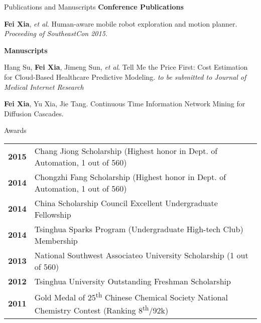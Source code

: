 \documentclass{resume} %
\begin{document}
\begin{rSection}{Publications and Manuscripts}
{\bf Conference Publications}
\begin{enumerate}[label={[}\arabic*{]}]
	\item {\bf Fei Xia}, {\it et al}. Human-aware mobile robot exploration and motion planner. {\it Proceeding of SoutheastCon 2015.}	
\end{enumerate}
{\bf Manuscripts}

\begin{enumerate}[label={[}\arabic*{]}]
	\item Hang Su, {\bf Fei Xia}, Jimeng Sun, {\it et al}. Tell Me the Price First: Cost Estimation for Cloud-Based Healthcare Predictive Modeling. {\it to be submitted to Journal of Medical Internet Research}
	\item {\bf Fei Xia}, Yu Xia, Jie Tang. Continuous Time Information Network Mining for Diffusion Cascades. 	
\end{enumerate}

\end{rSection}




\begin{rSection}{Awards}

\begin{tabular}{ @{} >{\bfseries}l @{\hspace{3ex}} l }
2015 & Chang Jiong Scholarship (Highest honor in Dept. of Automation, 1 out of 560) \\

2014 & Chongzhi Fang Scholarship (Highest honor in Dept. of Automation, 1 out of 560) \\
2014 & China Scholarship Council Excellent Undergraduate Fellowship \\
2014 &Tsinghua Sparks Program (Undergraduate High-tech Club) Membership \\

2013 & National Southwest Associateo University Scholarship (1 out of 560) \\
2012 & Tsinghua University Outstanding Freshman Scholarship \\
2011 & Gold Medal of 25\textsuperscript{th} Chinese Chemical Society National Chemistry Contest (Ranking 8\textsuperscript{th}/92k)
\end{tabular}

\end{rSection}
\end{document}
